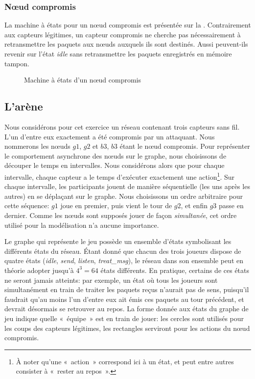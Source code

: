         \subsubsection{Nœud compromis}
La machine à états pour un nœud compromis est présentée sur la .
Contrairement aux capteurs légitimes, un capteur compromis ne cherche pas nécessairement à retransmettre les paquets aux nœuds auxquels ils sont destinés.
Aussi peuvent-ils revenir sur l'état \emph{idle} sans retransmettre les paquets enregistrés en mémoire tampon.
\begin{figure}[H]
    \centering
    
    \caption{Machine à états d'un nœud compromis}\label{tj:fig:autBadNode}
\end{figure}

\subsection{L'arène}
Nous considérons pour cet exercice un réseau contenant trois capteurs sans fil.
L'un d'entre eux exactement a été compromis par un attaquant.
Nous nommerons les nœuds $g1$, $g2$ et $b3$, $b3$ étant le nœud compromis.
Pour représenter le comportement asynchrone des nœuds sur le graphe, nous choisissons de découper le temps en intervalles.
Nous considérons alors que pour chaque intervalle, chaque capteur a le temps d'exécuter exactement une action\footnote{À noter qu'une « action » correspond ici à un état, et peut entre autres consister à « rester au repos ».}.
Sur chaque intervalle, les participants jouent de manière séquentielle (les uns après les autres) en se déplaçant sur le graphe.
Nous choisissons un ordre arbitraire pour cette séquence: $g1$ joue en premier, puis vient le tour de $g2$, et enfin $g3$ passe en dernier.
Comme les nœuds sont supposés jouer de façon \emph{simultanée}, cet ordre utilisé pour la modélisation n'a aucune importance.

Le graphe qui représente le jeu possède un ensemble d'états symbolisant les différents états du réseau.
Étant donné que chacun des trois joueurs dispose de quatre états (\emph{idle}, \emph{send}, \emph{listen}, \emph{treat\_msg}), le réseau dans son ensemble peut en théorie adopter jusqu'à $4^3=64$ états différents.
En pratique, certains de ces états ne seront jamais atteints: par exemple, un état où tous les joueurs sont simultanément en train de traiter les paquets reçus n'aurait pas de sens, puisqu'il faudrait qu'au moins l'un d'entre eux ait émis ces paquets au tour précédent, et devrait désormais se retrouver au repos.
La forme donnée aux états du graphe de jeu indique quelle « équipe » est en train de jouer: les cercles sont utilisés pour les coups des capteurs légitimes, les rectangles serviront pour les actions du nœud compromis.


